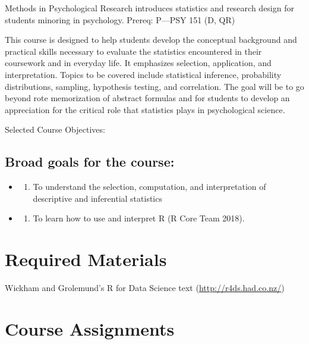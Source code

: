 \documentclass[
]{book}
\providecommand{\tightlist}{%
  \setlength{\itemsep}{0pt}\setlength{\parskip}{0pt}}
\begin{document}
Methods in Psychological Research introduces statistics and research design for students minoring in psychology. Prereq: P---PSY 151 (D, QR)

This course is designed to help students develop the conceptual background and practical skills necessary to evaluate the statistics encountered in their coursework and in everyday life. It emphasizes selection, application, and interpretation. Topics to be covered include statistical inference, probability distributions, sampling, hypothesis testing, and correlation. The goal will be to go beyond rote memorization of abstract formulas and for students to develop an appreciation for the critical role that statistics plays in psychological science.

Selected Course Objectives:

\hypertarget{broad-goals-for-the-course-1}{%
\subsection{Broad goals for the course:}\label{broad-goals-for-the-course-1}}

\begin{itemize}
\item
  \begin{enumerate}
  \def\labelenumi{\arabic{enumi}.}
  \tightlist
  \item
    To understand the selection, computation, and interpretation of descriptive and inferential
    statistics
  \end{enumerate}
\item
  \begin{enumerate}
  \def\labelenumi{\arabic{enumi}.}
  \setcounter{enumi}{1}
  \tightlist
  \item
    To learn how to use and interpret R (R Core Team 2018).
  \end{enumerate}
\end{itemize}

\hypertarget{required-materials-1}{%
\section{Required Materials}\label{required-materials-1}}

Wickham and Grolemund's R for Data Science text (\url{http://r4ds.had.co.nz/})

\hypertarget{course-assignments-1}{%
\section{Course Assignments}\label{course-assignments-1}}
\end{document}
